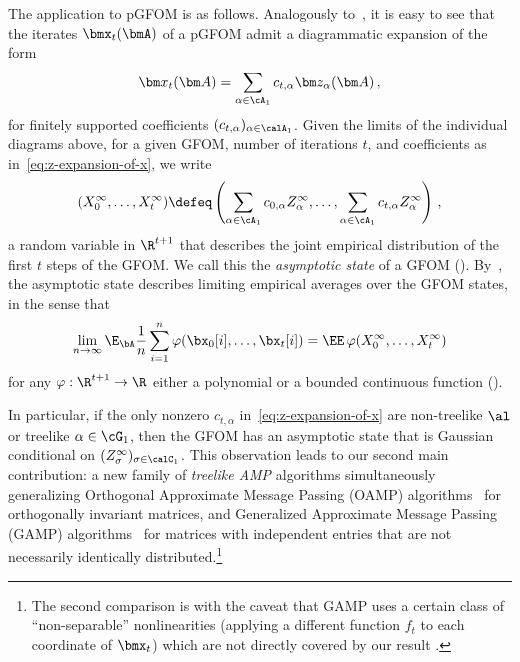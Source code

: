 The application to pGFOM is as follows.
Analogously to~,
it is easy to see that the iterates $\bmx_t(\bmA)$
of a pGFOM admit a diagrammatic expansion
of the form
\begin{equation}
\bm x_t(\bm A) = \sum_{\alpha \in \cA_1} c_{t, \alpha} \bm z_{\alpha}(\bm A)\,, \label{eq:z-expansion-of-x}
\end{equation}
for finitely supported coefficients
$(c_{t,\alpha})_{\alpha\in\calA_1}$.
Given the limits of the individual diagrams above, for a given GFOM, number of iterations $t$, and coefficients as in~\cref{eq:z-expansion-of-x}, we write
\begin{equation*}
    (X_0^{\infty}, \dots, X_t^{\infty}) \defeq \left(\sum_{\alpha \in \cA_1} c_{0, \alpha} Z_{\alpha}^{\infty}, \dots, \sum_{\alpha \in \cA_1} c_{t, \alpha} Z_{\alpha}^{\infty}\right)\,,\label{eq:asymptoticStateIntro}
\end{equation*}
a random variable in $\R^{t + 1}$ that describes the joint empirical distribution of the first $t$ steps of the GFOM.
We call this the \emph{asymptotic state} of a GFOM (). By~, the asymptotic state describes limiting empirical averages over the GFOM states, in the sense that
\[ \lim_{n \to \infty} \E_{\bA} \frac{1}{n}\sum_{i = 1}^n  \varphi(\bx_0[i], \dots, \bx_t[i]) = \EE\, \varphi(X_{0}^{\infty}, \dots, X_t^{\infty}) \]
for any $\varphi: \R^{t + 1} \to \R$ either a polynomial or a bounded continuous function ().

In particular, if the only nonzero $c_{t, \alpha}$ in~\cref{eq:z-expansion-of-x} are non-treelike $\al$ or treelike $\alpha \in \cG_1$, then the GFOM has an asymptotic state that is Gaussian conditional on $(Z_{\sigma}^{\infty})_{\sigma\in\calC_1}$.
This observation leads to our second main contribution: a new family of \emph{treelike AMP} algorithms simultaneously generalizing Orthogonal Approximate Message Passing (OAMP) algorithms~\cite{rangan2019vector, fan2022approximate} for orthogonally invariant matrices, and Generalized Approximate Message Passing (GAMP) algorithms~\cite{rangan2011generalized, javanmard2013state} for matrices with independent entries that are not necessarily identically distributed.\footnote{The second comparison is with the caveat that GAMP uses a certain class of ``non-separable'' nonlinearities (applying a different function $f_t$ to each coordinate of $\bmx_t$) which are not directly covered by our result \cite{rangan2011generalized, javanmard2013state}.}

